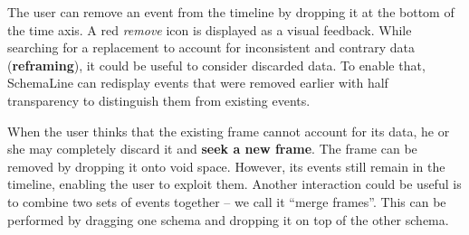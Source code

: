 The user can remove an event from the timeline by dropping it at the bottom of the time axis. A red \emph{remove} icon is displayed as a visual feedback. While searching for a replacement to account for inconsistent and contrary data (\textbf{reframing}), it could be useful to consider discarded data. To enable that, SchemaLine can redisplay events that were removed earlier with half transparency to distinguish them from existing events.

When the user thinks that the existing frame cannot account for its data, he or she may  completely discard it and \textbf{seek a new frame}. The frame can be removed by dropping it onto void space. However, its events still remain in the timeline, enabling the user to exploit them. Another interaction could be useful is to combine two sets of events together -- we call it ``merge frames''. This can be performed by dragging one schema and dropping it on top of the other schema.